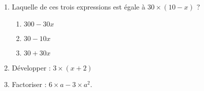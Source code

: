 
\begin{exercice}\label{exosmath-0969}

    \begin{enumerate}
        \item
            Laquelle de ces trois expressions est égale à \(  30\times (10-x)  \) ?
            \begin{enumerate}
                \item
                    \( 300-30x\)
                \item
                    \( 30-10x\)
                \item
                    \( 30+30x\)
            \end{enumerate}
        \item
            Développer : \( 3\times (x+2)\)
        \item
            Factoriser : \( 6\times a-3\times a^2\).
    \end{enumerate}

\end{exercice}
